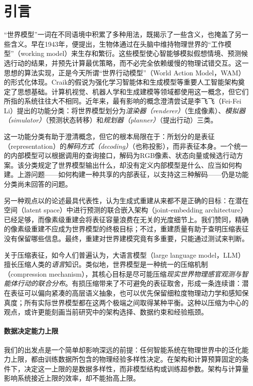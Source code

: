 \section{引言}

“世界模型”一词在不同语境中积累了多种用法，既揭示了一些含义，也掩盖了另一些含义。早在1943年，\cite{craik1943nature}便提出，生物体通过在头脑中维持物理世界的“工作模型”（working model）来生存和繁衍。这些模型使心智能够模拟假想情境、预测候选行动的结果，并预先计算最优策略，而不必完全依赖缓慢的物理试错交互。这一思想的算法实现，正是今天所谓“世界行动模型”（World Action Model，WAM）的形式化体现。Craik的假说为强化学习智能体和生成模型等重要人工智能架构奠定了思想基础\citep{sutton2018rl}。计算机视觉、机器人学和生成建模等领域都使用这一概念，但它们所指的系统往往大不相同。近年来，最有影响的概念澄清尝试是李飞飞（Fei-Fei Li）提出的功能分类：将世界模型划分为\textit{渲染器（renderer）}（生成像素）、\textit{模拟器（simulator）}（预测状态转移）和\textit{规划器（planner）}（提出行动）三类\citep{worldlabs2026taxonomy}。

这一功能分类有助于澄清概念，但它的根本局限在于：所划分的是表征（representation）的\textit{解码方式（decoding）}（也称投影），而非表征本身。一个统一的内部模型可以根据调用的查询接口，解码为RGB像素、状态向量或候选行动方案。该分类规定了世界模型输出什么，却没有定义内部模型是什么、应当如何构建。上游问题——如何构建一种共享的内部表征，以支持这三种解码——仍是功能分类尚未回答的问题。

另一种观点以\cite{lecun2022path}的论述最具代表性，认为生成式重建从来都不是正确的目标：在潜在空间（latent space）中进行预测的联合嵌入架构（joint-embedding architecture）已经足够，而像素级重建会将表征容量浪费在无关的光度细节上。我们赞同，精确的像素级重建不应成为世界模型的终极目标；不过，重建质量有助于查明压缩表征没有保留哪些信息。最终，重建对世界建模究竟有多重要，只能通过测试来判断。

关于压缩表征，如今人们普遍认为，大语言模型（large language model，LLM）擅长压缩人类的\textit{语言}知识。类似地，世界模型是一种统一的压缩机制（compression mechanism），其核心目标是尽可能压缩\textit{现实世界物理感官观测与智能体行动的联合分布}。有损压缩带来了不可避免的表征取舍，形成一条连续谱：潜在表征可以偏向紧凑的高层语义抽象，也可以优先保留细粒度物理动力学和感知保真度；所有实际世界模型都在这两个极端之间取得某种平衡。这种以压缩为中心的观点，或许更能刻画当前研究中的架构选择、数据约束和经验瓶颈。

\paragraph{数据决定能力上限}
我们的出发点是一个简单却影响深远的前提：任何智能系统在物理世界中的泛化能力上限，都由训练数据所包含的物理经验多样性决定。在架构和计算预算固定的条件下，决定这一上限的是数据多样性，而非模型结构或训练超参数。架构与计算量影响系统接近上限的效率，却不能抬高上限\citep{hoffmann2022training}。

